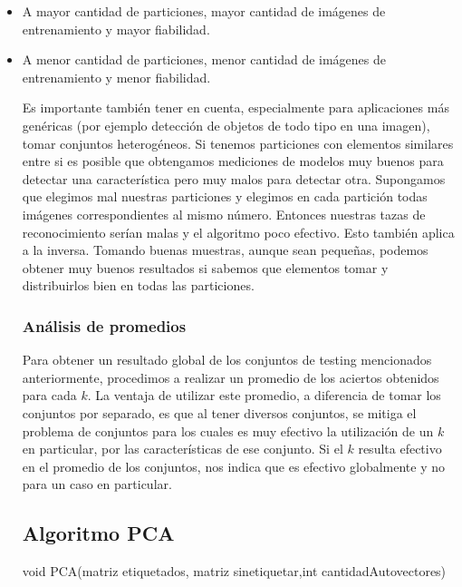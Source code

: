\begin{itemize}
	\item A mayor cantidad de particiones, mayor cantidad de imágenes de entrenamiento y mayor fiabilidad.
	\item A menor cantidad de particiones, menor cantidad de imágenes de entrenamiento y menor fiabilidad.
\begin{itemize}

Es importante también tener en cuenta, especialmente para aplicaciones más genéricas (por ejemplo detección de objetos de todo tipo en una imagen), tomar conjuntos heterogéneos. Si tenemos particiones con elementos similares entre si es posible que obtengamos mediciones de modelos muy buenos para detectar una característica pero muy malos para detectar otra. Supongamos que elegimos mal nuestras particiones y elegimos en cada partición todas imágenes correspondientes al mismo número. Entonces nuestras tazas de reconocimiento serían malas y el algoritmo poco efectivo. Esto también aplica a la inversa. Tomando buenas muestras, aunque sean pequeñas, podemos obtener muy buenos resultados si sabemos que elementos tomar y distribuirlos bien en todas las particiones.

\subsubsection{Análisis de promedios}

Para obtener un resultado global de los conjuntos de testing mencionados anteriormente, procedimos a realizar un promedio de los aciertos obtenidos para cada $k$.
La ventaja de utilizar este promedio, a diferencia de tomar los conjuntos por separado, es que al tener diversos conjuntos, se mitiga el problema de conjuntos para los cuales es muy efectivo la utilización de un $k$ en particular, por las características de ese conjunto. Si el $k$ resulta efectivo en el promedio de los conjuntos, nos indica que es efectivo globalmente y no para un caso en particular.

\subsection{Algoritmo PCA}

\begin{algorithm}
\begin{algorithmic}[1]\parskip=1mm
\caption{void PCA(matriz etiquetados, matriz sinetiquetar,int cantidadAutovectores)}
\ENDFOR\\
\end{algorithmic}
\end{algorithm}


\end{itemize}
\end{itemize}
